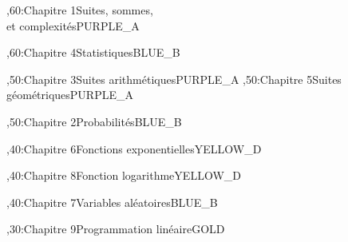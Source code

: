 \documentclass[tikz]{standalone}
\begin{document}
%
	\begin{chart}
	,60:{Chapitre 1}{Suites, sommes, \\ et complexités}{}{PURPLE_A}
	
	,60:{Chapitre 4}{Statistiques}{}{BLUE_B}
	
	,50:{Chapitre 3}{Suites arithmétiques}{}{PURPLE_A}
	,50:{Chapitre 5}{Suites géométriques}{}{PURPLE_A}
	
	,50:{Chapitre 2}{Probabilités}{}{BLUE_B}
	
	,40:{Chapitre 6}{Fonctions exponentielles}{}{YELLOW_D}
	
	,40:{Chapitre 8}{Fonction logarithme}{}{YELLOW_D}
	
	,40:{Chapitre 7}{Variables aléatoires}{}{BLUE_B}
	
	,30:{Chapitre 9}{Programmation linéaire}{}{GOLD}
	
	
	
	
	
	
	
	
	

	
	
	
	
	
	
	\end{chart}
%
\end{document}
